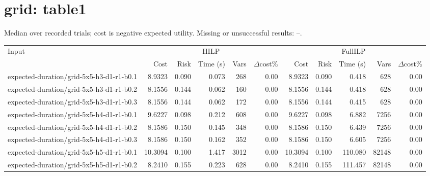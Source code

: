 \documentclass[10pt]{article}
\begin{document}
\section*{grid: table1}
\noindent Median over recorded trials; cost is negative expected utility. Missing or unsuccessful results: --.\par
\small\begin{tabular}{p{65mm}rrrrrrrrrr}
\toprule
Input & \multicolumn{5}{c}{HILP} & \multicolumn{5}{c}{FullILP} \\
 & Cost & Risk & Time (s) & Vars & $\Delta$cost\% & Cost & Risk & Time (s) & Vars & $\Delta$cost\% \\
\midrule
expected-\allowbreak duration/\allowbreak grid-\allowbreak 5x5-\allowbreak h3-\allowbreak d1-\allowbreak r1-\allowbreak b0.1 & 8.9323 & 0.090 & 0.073 & 268 & 0.00 & 8.9323 & 0.090 & 0.418 & 628 & 0.00 \\
expected-\allowbreak duration/\allowbreak grid-\allowbreak 5x5-\allowbreak h3-\allowbreak d1-\allowbreak r1-\allowbreak b0.2 & 8.1556 & 0.144 & 0.062 & 160 & 0.00 & 8.1556 & 0.144 & 0.418 & 628 & 0.00 \\
expected-\allowbreak duration/\allowbreak grid-\allowbreak 5x5-\allowbreak h3-\allowbreak d1-\allowbreak r1-\allowbreak b0.3 & 8.1556 & 0.144 & 0.062 & 172 & 0.00 & 8.1556 & 0.144 & 0.415 & 628 & 0.00 \\
expected-\allowbreak duration/\allowbreak grid-\allowbreak 5x5-\allowbreak h4-\allowbreak d1-\allowbreak r1-\allowbreak b0.1 & 9.6227 & 0.098 & 0.212 & 608 & 0.00 & 9.6227 & 0.098 & 6.882 & 7256 & 0.00 \\
expected-\allowbreak duration/\allowbreak grid-\allowbreak 5x5-\allowbreak h4-\allowbreak d1-\allowbreak r1-\allowbreak b0.2 & 8.1586 & 0.150 & 0.145 & 348 & 0.00 & 8.1586 & 0.150 & 6.439 & 7256 & 0.00 \\
expected-\allowbreak duration/\allowbreak grid-\allowbreak 5x5-\allowbreak h4-\allowbreak d1-\allowbreak r1-\allowbreak b0.3 & 8.1586 & 0.150 & 0.162 & 352 & 0.00 & 8.1586 & 0.150 & 6.605 & 7256 & 0.00 \\
expected-\allowbreak duration/\allowbreak grid-\allowbreak 5x5-\allowbreak h5-\allowbreak d1-\allowbreak r1-\allowbreak b0.1 & 10.3094 & 0.100 & 1.417 & 3012 & 0.00 & 10.3094 & 0.100 & 110.080 & 82148 & 0.00 \\
expected-\allowbreak duration/\allowbreak grid-\allowbreak 5x5-\allowbreak h5-\allowbreak d1-\allowbreak r1-\allowbreak b0.2 & 8.2410 & 0.155 & 0.223 & 628 & 0.00 & 8.2410 & 0.155 & 111.457 & 82148 & 0.00 \\

\end{tabular}
\end{document}
